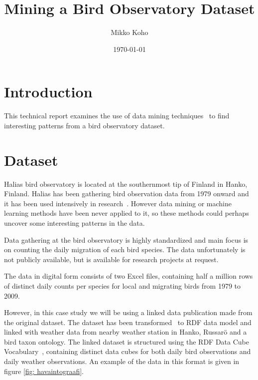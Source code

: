 \documentclass[english]{tktltiki2}
\title{Mining a Bird Observatory Dataset}
\author{Mikko Koho}
\date{\today}
\begin{document}
    

\frontmatter      %

\maketitle        %

\makeabstract     %

\tableofcontents  %


\mainmatter       %


\section{Introduction}

This technical report examines the use of data mining techniques~\cite{tan2006introduction} to find interesting patterns from a bird observatory dataset.



\section{Dataset}

Halias bird observatory is located at the southernmost tip of Finland in Hanko, Finland. Halias has been gathering bird observation data from 1979 onward and it has been used intensively in research~\cite{HangonJulkaisut}. However data mining or machine learning methods have been never applied to it, so these methods could perhaps uncover some interesting patterns in the data.

Data gathering at the bird observatory is highly standardized and main focus is on counting the daily migration of each bird species. The data unfortunately is not publicly available, but is available for research projects at request.

The data in digital form consists of two Excel files, containing half a million rows of distinct daily counts per species for local and migrating birds from 1979 to 2009.

However, in this case study we will be using a linked data publication made from the original dataset. The dataset has been transformed~\cite{koho-hyvonen-orni-2014, koho2015gradu} to RDF data model and linked with weather data from nearby weather station in Hanko, Russarö and a bird taxon ontology. %
The linked dataset is structured using the RDF Data Cube Vocabulary~\cite{w3crdfdatacube}, containing distinct data cubes for both daily bird observations and daily weather observations. An example of the data in this format is given in figure \ref{fig: havaintograafi}.
\end{document}

